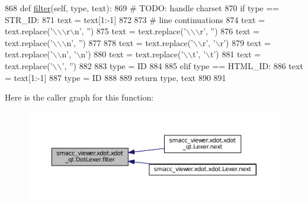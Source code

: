\begin{DoxyCode}
868     \textcolor{keyword}{def }\hyperlink{classsmacc__viewer_1_1xdot_1_1xdot__qt_1_1DotLexer_adf9b3add46fdb9d96f457be225abd5b7}{filter}(self, type, text):
869         \textcolor{comment}{# TODO: handle charset}
870         \textcolor{keywordflow}{if} type == STR\_ID:
871             text = text[1:-1]
872 
873             \textcolor{comment}{# line continuations}
874             text = text.replace(\textcolor{stringliteral}{'\(\backslash\)\(\backslash\)\(\backslash\)r\(\backslash\)n'}, \textcolor{stringliteral}{''})
875             text = text.replace(\textcolor{stringliteral}{'\(\backslash\)\(\backslash\)\(\backslash\)r'}, \textcolor{stringliteral}{''})
876             text = text.replace(\textcolor{stringliteral}{'\(\backslash\)\(\backslash\)\(\backslash\)n'}, \textcolor{stringliteral}{''})
877 
878             text = text.replace(\textcolor{stringliteral}{'\(\backslash\)\(\backslash\)r', '}\(\backslash\)r')
879             text = text.replace(\textcolor{stringliteral}{'\(\backslash\)\(\backslash\)n'}, \textcolor{stringliteral}{'\(\backslash\)n'})
880             text = text.replace(\textcolor{stringliteral}{'\(\backslash\)\(\backslash\)t'}, \textcolor{stringliteral}{'\(\backslash\)t'})
881             text = text.replace(\textcolor{stringliteral}{'\(\backslash\)\(\backslash\)'}, \textcolor{stringliteral}{''})
882 
883             type = ID
884 
885         \textcolor{keywordflow}{elif} type == HTML\_ID:
886             text = text[1:-1]
887             type = ID
888 
889         \textcolor{keywordflow}{return} type, text
890 
891 
\end{DoxyCode}


Here is the caller graph for this function\+:
\nopagebreak
\begin{figure}[H]
\begin{center}
\leavevmode
\includegraphics[width=350pt]{classsmacc__viewer_1_1xdot_1_1xdot__qt_1_1DotLexer_adf9b3add46fdb9d96f457be225abd5b7_icgraph}
\end{center}
\end{figure}




